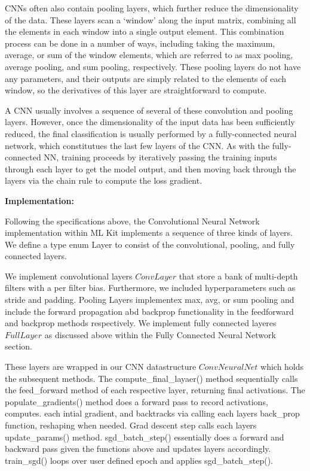 CNNs often also contain pooling layers, which further reduce the dimensionality of the data.
These layers scan a `window' along the input matrix, combining all the elements in each window into a single output element.
This combination process can be done in a number of ways, including taking the maximum, average, or sum of the window elements, which are referred to as max pooling, average pooling, and sum pooling, respectively.
These pooling layers do not have any parameters, and their outputs are simply related to the elements of each window, so the derivatives of this layer are straightforward to compute.

A CNN usually involves a sequence of several of these convolution and pooling layers.
However, once the dimensionality of the input data has been sufficiently reduced, the final classification is usually performed by a fully-connected neural network, which constitutues the last few layers of the CNN.
As with the fully-connected NN, training proceeds by iteratively passing the training inputs through each layer to get the model output, and then moving back through the layers via the chain rule to compute the loss gradient.

\begin{center}
 \textbf{Implementation:}
\end{center}

Following the specifications above, the Convolutional Neural Network implementation within ML Kit implements a sequence of three kinds of layers. 
We define a type enum Layer to consist of the convolutional, pooling, and fully connected layers. 

We implement convolutional layers $ConvLayer$ that store a bank of multi-depth filters with a per filter bias. Furthermore, we included hyperparameters 
such as stride and padding. Pooling Layers implementex max, avg, or sum pooling and include the forward propagation abd backprop functionality in the feedforward 
and backprop methods respectively. We implement fully connected layeres $FullLayer$ as discussed above within the Fully Connected Neural Network section. 

These layers are wrapped in our CNN datastructure $ConvNeuralNet$ which holds the subsequent methods. The compute\_final\_layaer() method sequentially calls the feed\_forward method of each respective layer, returning final activations. The populate\_gradients() method does a forward pass to record activations, computes.
each intial gradient, and backtracks via calling each layers back\_prop function, reshaping when needed. Grad descent step calls each layers update\_params() method. 
sgd\_batch\_step() essentially does a forward and backward pass given the functions above and updates layers accordingly. train\_sgd() loops over user defined epoch and applies 
sgd\_batch\_step(). 


